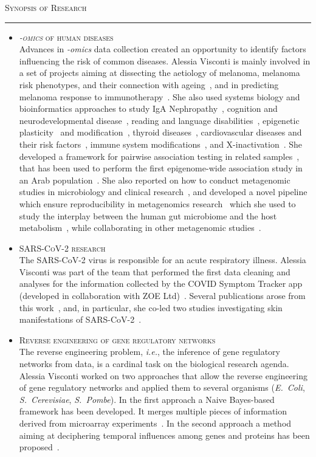 \documentclass[a4paper,10pt]{article}
\newcommand{\mediumtitle}[1]{
	\vspace{0.2cm}
	{\noindent
	\Large \textsc{#1}\\[-2ex]
	\hrule
	\vspace{0.2cm}}
}
\newcommand{\smalltitle}[1]{
	\vspace{0.1cm}
	{\noindent 
	\large \textsc{#1}}
	\vspace{0.1cm}
}
\newcommand{\bulletitem}{\item[$\bullet$]}
\begin{document}
\newpage


\mediumtitle{Synopsis of Research}

\begin{itemize}
	
\bulletitem \smalltitle{\emph{-omics} of human diseases}\\
Advances in \emph{-omics} data collection created an opportunity to identify factors influencing the risk of common diseases. Alessia Visconti is mainly involved in a set of projects aiming at dissecting the aetiology of melanoma, melanoma risk phenotypes, and their connection with ageing~\cite{Rib16,Pui16,Hys18,Vis18a,Duf17,Vis19a,Vis20,Lan20,San20,Gro21,Swi15}, and in predicting melanoma response to immunotherapy~\cite{Ros22}.
She also used systems biology and bioinformatics approaches to study IgA Nephropathy~\cite{Lom16,Dot21}, cognition and neurodevelopmental disease~\cite{Joh15,Cul18}, reading and language disabilities~\cite{Gia16}, epigenetic plasticity~\cite{Car16} and modification~\cite{Zag18}, thyroid diseases~\cite{Mar20}, cardiovascular diseases and their risk factors~\cite{Ros21}, immune system modifications~\cite{Pia21}, and X-inactivation~\cite{Zit21}. 
She developed a framework for pairwise association testing in related samples~\cite{Vis16}, that has been used to perform the first epigenome-wide association study in an Arab population~\cite{AlM15}. 
She also reported on how to conduct metagenomic studies in microbiology and clinical research~\cite{Vis18c}, and developed a novel pipeline which ensure reproducibility in metagenomics research~\cite{Vis18b} which she used to study the interplay between the human gut microbiome and the host metabolism~\cite{Vis19}, while collaborating in other metagenomic studies~\cite{Bar20,LeR22}.

\bulletitem \smalltitle{SARS-CoV-2 research}\\
The SARS-CoV-2 virus is responsible for an acute respiratory illness.
Alessia Visconti was part of the team that performed the first data cleaning and analyses for the information collected by the COVID Symptom Tracker app (developed in collaboration with ZOE Ltd)~\cite{Mur21}. Several publications arose from this work~\cite{Men20,Lee20, Zaz20,Hop21,Wil21,Sud21}, and, in particular, she co-led two studies investigating skin manifestations of SARS-CoV-2~\cite{Vis21, Vis22}.

\bulletitem \smalltitle{Reverse engineering of gene regulatory networks}\\
The reverse engineering problem, \emph{i.e.}, the inference of gene regulatory networks from data, is a cardinal task on the biological research agenda.
Alessia Visconti worked on two approaches that allow the reverse engineering of gene regulatory networks and applied them to several organisms (\emph{E.~Coli}, \emph{S.~Cerevisiae}, \emph{S.~Pombe}). In the first approach a Naive Bayes-based framework has been developed. It merges multiple pieces of information derived from microarray experiments~\cite{Mar12, Vis11b}. In the second approach a method aiming at deciphering temporal influences among genes and proteins has been proposed~\cite{Vis12b}. 


\end{itemize}
\end{document}
